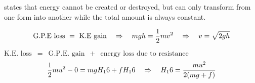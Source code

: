 









\begin{ilight}
	 states that energy cannot be created or destroyed, but can only transform from one form into another while the total amount is always constant.  
\end{ilight}


\begin{soln}
\begin{equation*}
	\text{G.P.E loss }  =  \text{ K.E gain} \quad \Rightarrow \quad mgh = \frac{1}{2}mv^2 \quad \Rightarrow \quad v=\sqrt{2gh} 
\end{equation*}
\end{soln}


\begin{soln} $\text{K.E. loss} \,\,\, = \,\,\, \text{G.P.E. gain} \,\,\, + \,\,\, \text{energy loss due to resistance}$
\begin{equation*}
	\frac{1}{2}mu^2 - 0 = mgH_16 + f H_16 \quad \Rightarrow \quad  H_16 = \frac{mu^2}{2(mg+f)}
\end{equation*}
\end{soln}

